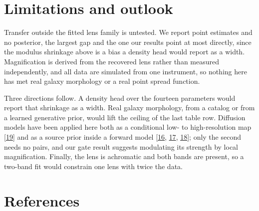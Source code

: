 \documentclass{article}
\newcommand{\rf}[1]{\hyperlink{ref#1}{#1}}
\begin{document}
\section{Limitations and outlook}
\label{limitations}

Transfer outside the fitted lens family is untested. We report point estimates and no
posterior, the largest gap and the one our results point at most directly, since
the modulus shrinkage above is a bias a density head would report as a width.
Magnification is derived from the recovered lens rather than measured
independently, and all data are simulated from one instrument, so nothing here
has met real galaxy morphology or a real point spread function.

Three directions follow. A density head over the fourteen parameters would
report that shrinkage as a width. Real galaxy morphology, from a catalog or from
a learned generative prior, would lift the ceiling of the last table row.
Diffusion models have been applied here both as a conditional low- to
high-resolution map [\rf{19}] and as a source prior inside a forward model
[\rf{16}, \rf{17}, \rf{18}]; only the second needs no pairs, and our gate
result suggests modulating its strength by local magnification. Finally, the lens is achromatic and both bands are present,
so a two-band fit would constrain one lens with twice the data.

\section*{References}
\end{document}
